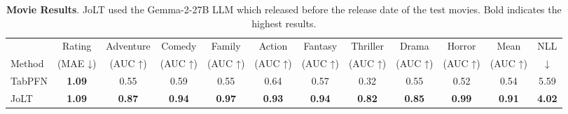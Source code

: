 \begin{table*}[h]
  \centering
  \caption{\textbf{Movie Results}. JoLT used the Gemma-2-27B LLM which released before the release date of the test movies. Bold indicates the highest results.}
  \label{tab:movies}%
  \vskip 0.05in
  \begin{small}
  \begin{sc}
  \begin{adjustbox}{max width=\textwidth}
    \begin{tabular}{lccccccccccc}
    \toprule
          & \multicolumn{1}{p{4.045em}}{ \centering Rating} & \multicolumn{1}{p{5.135em}}{\centering Adventure} & \multicolumn{1}{p{4.045em}}{ \centering Comedy} & \multicolumn{1}{p{4.045em}}{\centering Family} & \multicolumn{1}{p{4.045em}}{\centering Action} & \multicolumn{1}{p{4.045em}}{\centering Fantasy} & \multicolumn{1}{p{4.045em}}{ Thriller} & \multicolumn{1}{p{4.045em}}{\centering Drama} & \multicolumn{1}{p{4.045em}}{\centering Horror} & \multicolumn{1}{p{4.045em}}{\centering Mean} & \multicolumn{1}{p{4.045em}}{\centering NLL} \\
    Method & \centering (MAE ↓) & \centering (AUC ↑) & \centering (AUC ↑) & \centering (AUC ↑) & \centering (AUC ↑) & \centering (AUC ↑) & \centering (AUC ↑) & (AUC ↑) & (AUC ↑) & (AUC ↑) & ↓ \\
    \midrule
    TabPFN & \textbf{1.09} & 0.55  & 0.59  & 0.55  & 0.64  & 0.57  & 0.32  & 0.55  & 0.52  & 0.54  & 5.59 \\
    JoLT  & \textbf{1.09} & \textbf{0.87} & \textbf{0.94} & \textbf{0.97} & \textbf{0.93} & \textbf{0.94} & \textbf{0.82} & \textbf{0.85} & \textbf{0.99} & \textbf{0.91} & \textbf{4.02} \\
    \bottomrule
    \end{tabular}%
    \end{adjustbox}
    \end{sc}
    \end{small}
\vspace{-4mm}
\end{table*}%

